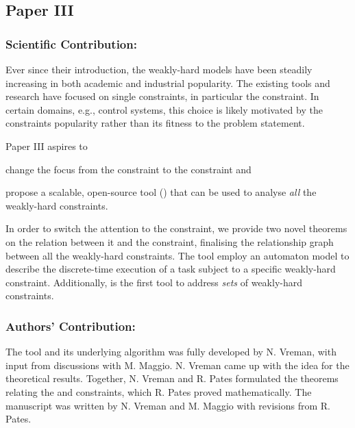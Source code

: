 \subsection*{Paper III}%
%
\begin{quote}
\end{quote}

\subsubsection*{Scientific Contribution:}%
%
Ever since their introduction, the weakly-hard models have been steadily increasing in both academic and industrial popularity.
The existing tools and research have focused on single constraints, in particular the \tAM{} constraint.
In certain domains, e.g., control systems, this choice is likely motivated by the \tAM{} constraints popularity rather than its fitness to the problem statement.

Paper III aspires to
\begin{enumerate*}[label=(\roman*)]
    \item change the focus from the \tAM{} constraint to the \tRH{} constraint and
    \item propose a scalable, open-source tool (\tool{}) that can be used to analyse \emph{all} the weakly-hard constraints.
\end{enumerate*}
In order to switch the attention to the \tRH{} constraint, we provide two novel theorems on the relation between it and the \tAH{} constraint, finalising the relationship graph between all the weakly-hard constraints.
The \tool{} tool employ an automaton model to describe the discrete-time execution of a task subject to a specific weakly-hard constraint.
Additionally, \tool{} is the first tool to address \emph{sets} of weakly-hard constraints.

\subsubsection*{Authors' Contribution:}%
%
The tool and its underlying algorithm was fully developed by N. Vreman, with input from discussions with M. Maggio.
N. Vreman came up with the idea for the theoretical results.
Together, N. Vreman and R. Pates formulated the theorems relating the \tAH{} and \tRH{} constraints, which R. Pates proved mathematically.
The manuscript was written by N. Vreman and M. Maggio with revisions from R. Pates.



